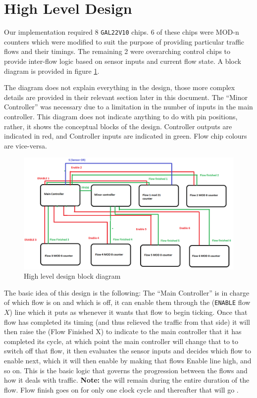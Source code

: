 \section{High Level Design}
Our implementation required 8 \texttt{GAL22V10} chips. 6 of these chips were
MOD-n counters which were modified to suit the purpose of providing particular
traffic flows and their timings. The remaining 2 were overarching control chips
to provide inter-flow logic based on sensor inputs and current flow state. A
block diagram is provided in figure \ref{fig:overall-design}.

The diagram does not explain everything in the design, those more complex
details are provided in their relevant section later in this document. The
``Minor Controller'' was necessary due to a limitation in the number of inputs
in the main controller. This diagram does not indicate anything to do with pin
positions, rather, it shows the conceptual blocks of the design. Controller
outputs are indicated in red, and Controller inputs are indicated in green. Flow
chip colours are vice-versa.

\begin{figure}[!t]
\includegraphics[width=\linewidth]{img/LJNpzV.png}
\caption{High level design block diagram}
\label{fig:overall-design}
\end{figure}

The basic idea of this design is the following: The ``Main Controller'' is in
charge of which flow is on and which is off, it can enable them through the \ENX
(\texttt{ENABLE} flow $X$) line which it puts as \HIGH whenever it wants that
flow to begin ticking. Once that flow has completed its timing (and thus
relieved the traffic from that side) it will then raise the \FFX (Flow
Finished X) to indicate to the main controller that it has completed its cycle,
at which point the main controller will change that \ENX to \LOW to switch off
that flow, it then evaluates the sensor inputs and decides which flow to enable
next, which it will then enable by making that flows Enable line high, and so
on. This is the basic logic that governs the progression between the flows and
how it deals with traffic. \textbf{Note:} the \ENX will remain \HIGH during the
entire duration of the flow. Flow finish goes on for only one clock cycle and
thereafter that \ENX will go \LOW.